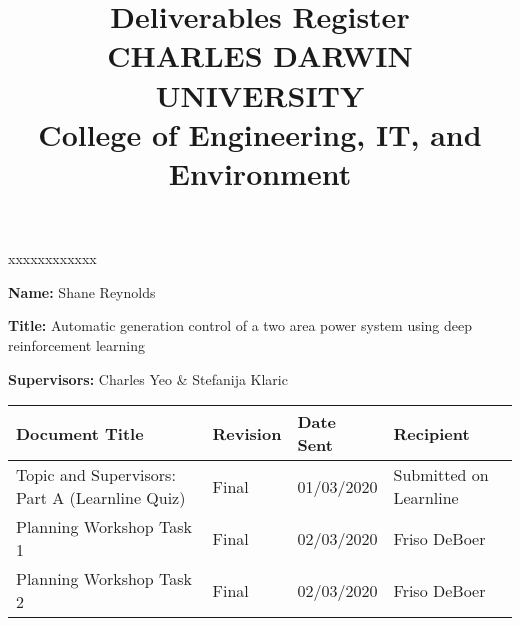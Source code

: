 \documentclass[10pt, landscape]{article}
\title{	
		Deliverables Register\\
		CHARLES DARWIN UNIVERSITY\\
		College of Engineering, IT, and Environment
	  }
\author{}
\date{}
\begin{document}
	
	\maketitle
	
	\begin{namelist}{xxxxxxxxxxxx}
		\item[{\bf Name:}]
			Shane Reynolds
		\item[{\bf Title:}]
			Automatic generation control of a two area power system using deep reinforcement learning
		\item[{\bf Supervisors:}]
			Charles Yeo \& Stefanija Klaric
	\end{namelist}
	
	\begin{tabular}{p{10cm}p{4cm}p{4cm}p{4cm}}
	\toprule
	\textbf{Document Title} 						& \textbf{Revision} & \textbf{Date Sent} 	& \textbf{Recipient} \\
	\midrule
	Topic and Supervisors: Part A (Learnline Quiz)	& Final 			& 01/03/2020		 	& Submitted on Learnline\\
	Planning Workshop Task 1						& Final				& 02/03/2020		 	& Friso DeBoer\\
	Planning Workshop Task 2						& Final				& 02/03/2020			& Friso DeBoer\\
	\bottomrule
	\end{tabular}
\end{document}
